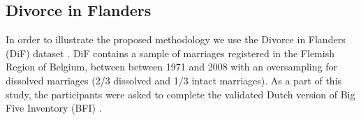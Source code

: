 \documentclass[11pt,a5paper,twoside]{book}
\begin{document}
\begin{table}[ht]
\centering
\caption[Comparing different methods of doing factor analysis with missing data]{Comparing different methods of doing factor analysis with missing data. The confidence interval is calculated using the Delta method.}
\label{tab_sim}
\end{table}

\subsection{Divorce in Flanders}
\label{sec_real}
In order to illustrate the proposed methodology we use the Divorce in Flanders (DiF) dataset \citep*{mortelmans2011}. DiF contains a sample of marriages registered in the Flemish Region of Belgium, between between 1971 and 2008 with an oversampling for dissolved marriages (2/3 dissolved and 1/3 intact marriages). As a part of this study, the participants were asked to complete the validated Dutch version \citep*{denissen2008} of Big Five Inventory (BFI) \citep{john1999}. 
\end{document}

